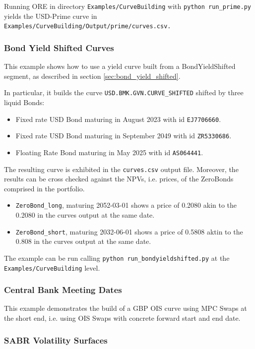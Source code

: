 Running ORE in directory {\tt Examples/CurveBuilding} with {\tt python run\_prime.py }
yields the USD-Prime curve in {\tt Examples/CurveBuilding/Output/prime/curves.csv.}

\subsubsection{Bond Yield Shifted Curves}

This example shows how to use a yield curve
built from a BondYieldShifted segment, as described in section \ref{sec:bond_yield_shifted}.

In particular, it builds the curve {\tt USD.BMK.GVN.CURVE\_SHIFTED} shifted by three liquid Bonds:

\begin{itemize}
\item Fixed rate USD Bond maturing in August 2023 with id {\tt EJ7706660}.
\item Fixed rate USD Bond maturing in September 2049 with id {\tt ZR5330686}.
\item Floating Rate Bond maturing in May 2025 with id {\tt AS064441}.
\end{itemize}

The resulting curve is exhibited in the {\tt curves.csv} output file.
Moreover, the results can be cross checked against the NPVs, i.e. prices, of the ZeroBonds comprised in the portfolio.
\begin{itemize}
\item {\tt ZeroBond\_long}, maturing 2052-03-01 shows a price of 0.2080 akin to the 0.2080 in the curves output at the same date.
\item {\tt ZeroBond\_short}, maturing 2032-06-01 shows a price of 0.5808 aktin to the 0.808 in the curves output at the same date.
\end{itemize}

The example can be run calling {\tt python run\_bondyieldshifted.py} at the {\tt Examples/CurveBuilding} level.

\subsubsection{Central Bank Meeting Dates}

This example demonstrates the build of a GBP OIS curve using MPC Swaps at the short end,
i.e. using OIS Swaps with concrete forward start and end date.

\subsubsection{SABR Volatility Surfaces}

